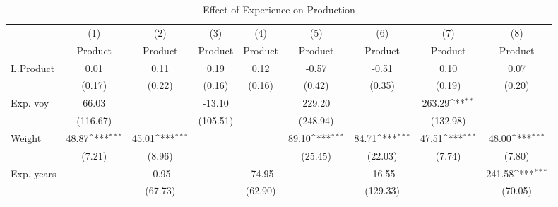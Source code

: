 \begin{table}[htbp]\centering
\def\sym#1{\ifmmode^{#1}\else\(^{#1}\)\fi}
\caption{Effect of Experience on Production}
\begin{tabular}{@{\hskip\tabcolsep\extracolsep\fill}l*{8}{c}}
\hline\hline
                    &\multicolumn{1}{c}{(1)}&\multicolumn{1}{c}{(2)}&\multicolumn{1}{c}{(3)}&\multicolumn{1}{c}{(4)}&\multicolumn{1}{c}{(5)}&\multicolumn{1}{c}{(6)}&\multicolumn{1}{c}{(7)}&\multicolumn{1}{c}{(8)}\\
                    &\multicolumn{1}{c}{Product}&\multicolumn{1}{c}{Product}&\multicolumn{1}{c}{Product}&\multicolumn{1}{c}{Product}&\multicolumn{1}{c}{Product}&\multicolumn{1}{c}{Product}&\multicolumn{1}{c}{Product}&\multicolumn{1}{c}{Product}\\
\hline
L.Product           &        0.01         &        0.11         &        0.19         &        0.12         &       -0.57         &       -0.51         &        0.10         &        0.07         \\
                    &      (0.17)         &      (0.22)         &      (0.16)         &      (0.16)         &      (0.42)         &      (0.35)         &      (0.19)         &      (0.20)         \\
Exp. voy            &       66.03         &                     &      -13.10         &                     &      229.20         &                     &      263.29\sym{**} &                     \\
                    &    (116.67)         &                     &    (105.51)         &                     &    (248.94)         &                     &    (132.98)         &                     \\
Weight              &       48.87\sym{***}&       45.01\sym{***}&                     &                     &       89.10\sym{***}&       84.71\sym{***}&       47.51\sym{***}&       48.00\sym{***}\\
                    &      (7.21)         &      (8.96)         &                     &                     &     (25.45)         &     (22.03)         &      (7.74)         &      (7.80)         \\
Exp. years          &                     &       -0.95         &                     &      -74.95         &                     &      -16.55         &                     &      241.58\sym{***}\\
                    &                     &     (67.73)         &                     &     (62.90)         &                     &    (129.33)         &                     &     (70.05)         \\

\end{tabular}
\end{table}
